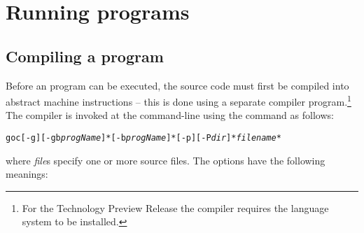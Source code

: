 \chapter{Running \texorpdfstring{\go}{Go!} programs}
\label{compile}

\section{Compiling a \texorpdfstring{\go}{Go!} program}
\label{compile:compile}

Before an \go program can be executed, the source code must first be compiled into abstract machine instructions -- this is done using a separate compiler program.\footnote{For the Technology Preview Release the \go compiler requires the \april language system to be installed.}  The \go compiler is invoked at the command-line using the  command as follows:
\begin{alltt}
goc [-g] [-gb \emph{progName}]* [-b \emph{progName}]* [-p] [-P \emph{dir}]* \emph{filename*}
\end{alltt}
where \emph{file}s specify one or more \go source files.  The options have the following meanings:

